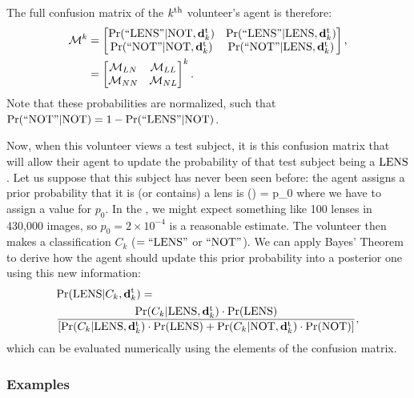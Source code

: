 \documentclass[useAMS,usenatbib,a4paper]{mn2e}
\begin{document}
The full confusion matrix of the $k^{\rm th}$ volunteer's agent is therefore:
\begin{align}
  \mathcal{M}^k &=
  \begin{bmatrix}
    {\rm Pr}({\rm ``LENS"}|{\rm NOT},{\mathbf{d}^{\rm t}_k}) & {\rm Pr}({\rm ``LENS"}|{\rm LENS},{\mathbf{d}^{\rm t}_k}) \\
    {\rm Pr}({\rm ``NOT"} |{\rm NOT},{\mathbf{d}^{\rm t}_k}) & {\rm Pr}({\rm ``NOT"} |{\rm LENS},{\mathbf{d}^{\rm t}_k})
  \end{bmatrix}, \notag \\
        &=
  \begin{bmatrix}
    \mathcal{M}_{LN} & \mathcal{M}_{LL} \\
    \mathcal{M}_{NN} & \mathcal{M}_{NL}
  \end{bmatrix}^k.
  \label{eq:confmat}
\end{align}
Note that these probabilities are normalized, such that
${\rm Pr}({\rm ``NOT"} |{\rm NOT}) = 1 - {\rm Pr}({\rm ``LENS"}|{\rm NOT})$.

Now, when this volunteer views a test subject,
it is this confusion matrix that will allow their agent to update the
probability of that test subject being a ${\rm LENS}$. Let us suppose that
this subject has never been seen before: the agent assigns a
prior probability that it is (or contains) a lens is
\be
  \pr(\LENS) = p_0
\ee
where we have to assign a value for $p_0$. In the \cfhtls, we might expect
something like 100 lenses in 430,000 images, so $p_0 = 2\times10^{-4}$
is a reasonable estimate. The volunteer then makes a classification $C_k$
($= {\rm ``LENS"}$ or ${\rm ``NOT"}$).
We can apply Bayes' Theorem to derive how the agent should
update this prior probability into a posterior one using this new information:
\begin{align}
  \label{eq:app:first}
  & {\rm Pr}({\rm LENS}|C_k,{\mathbf{d}^{\rm t}_k}) = \\
  & \frac{{\rm Pr}(C_k|{\rm LENS},{\mathbf{d}^{\rm t}_k})\cdot{\rm Pr}({\rm LENS})}
{\left[ {\rm Pr}(C_k|{\rm LENS},{\mathbf{d}^{\rm t}_k})\cdot{\rm Pr}({\rm LENS}) + {\rm Pr}(C_k|{\rm NOT},{\mathbf{d}^{\rm t}_k})\cdot{\rm Pr}({\rm NOT}) \right]},
  \notag
\end{align}
which can be evaluated numerically using the elements of the confusion
matrix.


\subsubsection{Examples}
\label{sec:swap:details:examples}
\end{document}
